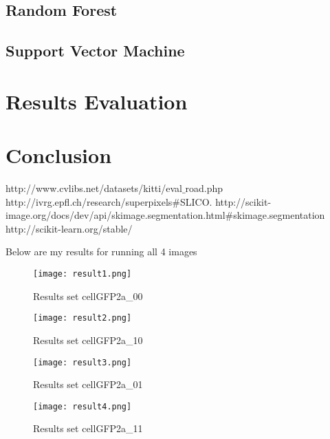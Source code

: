 \documentclass[paper=letter, fontsize=11pt]{scrartcl}
\numberwithin{equation}{section}		%
\numberwithin{figure}{section}			%
\numberwithin{table}{section}				%
\begin{document}
\subsection{Random Forest}
\subsection{Support Vector Machine}

\section{Results Evaluation}

\section{Conclusion}

\begin{thebibliography}{9}

  http://www.cvlibs.net/datasets/kitti/eval$\_$road.php
  http://ivrg.epfl.ch/research/superpixels$\#$SLICO. 
  http://scikit-image.org/docs/dev/api/skimage.segmentation.html$\#$skimage.segmentation
  http://scikit-learn.org/stable/
\end{thebibliography}




\if

Below are my results for running all 4 images
\begin{figure}[H]
\begin{center}
\texttt{[image: result1.png]}
\end{center}
\caption{Results set cellGFP2a\_00}
\label{fig:resultset1}
\end{figure}
\begin{figure}[H]
\begin{center}
\texttt{[image: result2.png]}
\end{center}
\caption{Results set cellGFP2a\_10}
\label{fig:resultset2}
\end{figure}
\begin{figure}[H]
\begin{center}
\texttt{[image: result3.png]}
\end{center}
\caption{Results set cellGFP2a\_01}
\label{fig:resultset3}
\end{figure}
\begin{figure}[H]
\begin{center}
\texttt{[image: result4.png]}
\end{center}
\caption{Results set cellGFP2a\_11}
\label{fig:resultset4}
\end{figure}

\fi
\end{document}
